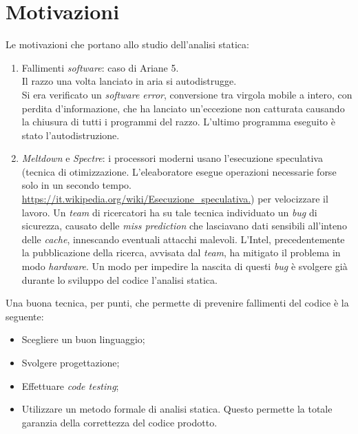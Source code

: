 \documentclass[10pt,                    %
               a4paper,                 %
               twoside,                 %
               openright,               %
               english,                 
               italian,                 
               ]{book}
\begin{document}
\section{Motivazioni}
Le motivazioni che portano allo studio dell'analisi statica:
\begin{enumerate}
\item Fallimenti \textit{software}: caso di Ariane 5.\\
Il razzo una volta lanciato in aria si autodistrugge.\\
Si era verificato un \textit{software error}, conversione tra virgola mobile a intero, con perdita d'informazione, che ha lanciato un'eccezione non catturata causando la chiusura di tutti i programmi del razzo. L'ultimo programma eseguito \`e stato l'autodistruzione.
\item \textit{Meltdown} e \textit{Spectre}: i processori moderni usano l'esecuzione speculativa (tecnica di otimizzazione. L'eleaboratore esegue operazioni necessarie forse solo in un secondo tempo. \url{https://it.wikipedia.org/wiki/Esecuzione_speculativa.}) per velocizzare il lavoro. Un \textit{team} di ricercatori ha su tale tecnica individuato un \textit{bug} di sicurezza, causato delle \textit{miss prediction} che lasciavano dati sensibili all'inteno delle \textit{cache}, innescando eventuali attacchi malevoli.
L'Intel, precedentemente la pubblicazione della ricerca, avvisata dal \textit{team}, ha mitigato il problema in modo \textit{hardware}. Un modo per impedire la nascita di questi \textit{bug} \`e svolgere gi\`a durante lo sviluppo del codice l'analisi statica. 
\end{enumerate}
\noindent
Una buona tecnica, per punti, che permette di prevenire fallimenti del codice \`e la seguente:
\begin{itemize}
\item Scegliere un buon linguaggio;
\item Svolgere progettazione;
\item Effettuare \textit{code testing};
\item Utilizzare un metodo formale di analisi statica. Questo permette la totale garanzia della correttezza del codice prodotto.
\end{itemize}
\end{document}
